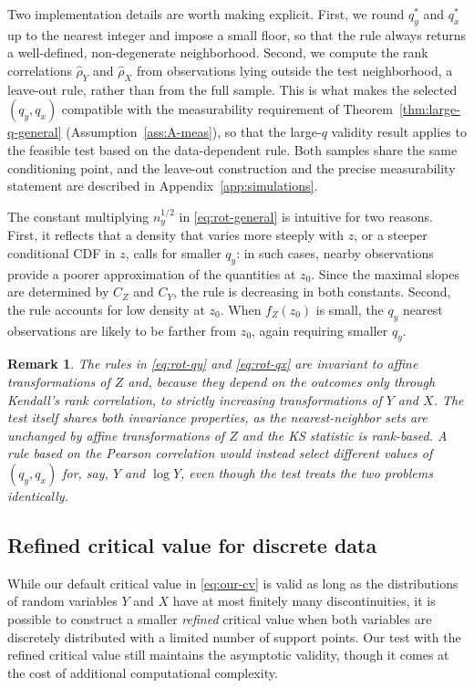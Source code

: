 \documentclass[11pt]{article}
\numberwithin{equation}{section}
\newtheorem{remark}{Remark}%
\begin{document}
Two implementation details are worth making explicit. First, we round $q_y^*$ and $q_x^*$ up to the nearest integer and impose a small floor, so that the rule always returns a well-defined, non-degenerate neighborhood. Second, we compute the rank correlations $\hat\rho_Y$ and $\hat\rho_X$ from observations lying outside the test neighborhood, a leave-out rule, rather than from the full sample. This is what makes the selected $(q_y,q_x)$ compatible with the measurability requirement of Theorem~\ref{thm:large-q-general} (Assumption~\ref{ass:A-meas}), so that the large-$q$ validity result applies to the feasible test based on the data-dependent rule. Both samples share the same conditioning point, and the leave-out construction and the precise measurability statement are described in Appendix~\ref{app:simulations}.

The constant multiplying $n_y^{1/2}$ in \eqref{eq:rot-general} is intuitive for two reasons. First, it reflects that 
a density that varies more steeply with $z$, or a steeper conditional CDF in $z$, calls for smaller $q_y$: in such cases, nearby observations provide a poorer approximation of the quantities at $z_0$. Since the maximal slopes are determined by $C_Z$ and $C_Y$, the rule is decreasing in both constants. Second, the rule accounts for low density at $z_0$. When $f_Z(z_0)$ is small, the $q_y$ nearest observations are likely to be farther from $z_0$, again requiring smaller $q_y$.

\begin{remark}
The rules in \eqref{eq:rot-qy} and \eqref{eq:rot-qx} are invariant to affine transformations of $Z$ and, because they depend on the outcomes only through Kendall's rank correlation, to strictly increasing transformations of $Y$ and $X$. The test itself shares both invariance properties, as the nearest-neighbor sets are unchanged by affine transformations of $Z$ and the KS statistic is rank-based. A rule based on the Pearson correlation would instead select different values of $(q_y, q_x)$ for, say, $Y$ and $\log Y$, even though the test treats the two problems identically.
\end{remark}

\subsection{Refined critical value for discrete data}\label{sec:discrete}
While our default critical value in \eqref{eq:our-cv} is valid as long as the distributions of random variables $Y$ and $X$ have at most finitely many discontinuities, it is possible to construct a smaller \textit{refined} critical value when both variables are discretely distributed with a limited number of support points. Our test with the refined critical value still maintains the asymptotic validity, though it comes at the cost of additional computational complexity.
\end{document}
